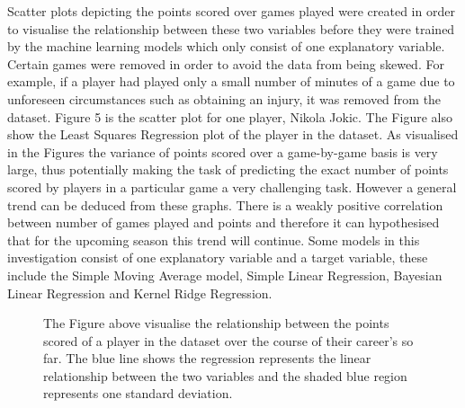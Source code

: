 \documentclass[a4paper,11pt,twoside]{article}
\begin{document}
Scatter plots depicting the points scored over games played were created in order to visualise the relationship between these two variables before they were trained by the machine learning models which only consist of one explanatory variable. Certain games were removed in order to avoid the data from being skewed. For example, if a player had played only a small number of minutes of a game due to unforeseen circumstances such as obtaining an injury, it was removed from the dataset. Figure 5 is the scatter plot for one player, Nikola Jokic. The Figure also show the Least Squares Regression plot of the player in the dataset. As visualised in the Figures the variance of points scored over a game-by-game basis is very large, thus potentially making the task of predicting the exact number of points scored by players in a particular game a very challenging task. However a general trend can be deduced from these graphs. There is a weakly positive correlation between number of games played and points and therefore it can hypothesised that for the upcoming season this trend will continue. Some models in this investigation consist of one explanatory variable and a target variable, these include the Simple Moving Average model, Simple Linear Regression, Bayesian Linear Regression and Kernel Ridge Regression.


      \begin{figure}[!htb]
      \captionsetup{justification=centering}
        \caption{\label{fig:my-label} The Figure above visualise the relationship between the points scored of a player in the dataset over the course of their career's so far. The blue line shows the regression represents the linear relationship between the two variables and the shaded blue region represents one standard deviation. }
      \end{figure}
\end{document}
